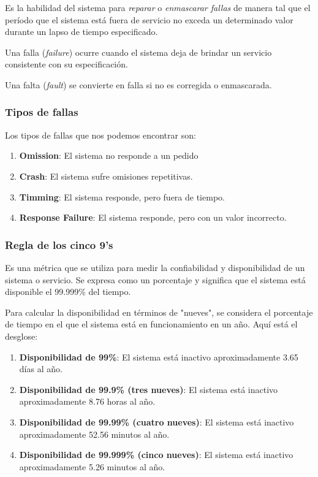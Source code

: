 \documentclass{article}
\begin{document}
			Es la habilidad del sistema para \textit{reparar} o \textit{enmascarar fallas} de manera tal que el período que el sistema está fuera de servicio no exceda un determinado valor durante un lapso de tiempo especificado.
			
			Una falla (\textit{failure}) ocurre cuando el sistema deja de brindar un servicio consistente con su especificación. 
			
			Una falta (\textit{fault}) se convierte en falla si no es corregida o enmascarada.
			
		\subsubsection{Tipos de fallas}
		
			Los tipos de fallas que nos podemos encontrar son: 
		
			\begin{enumerate}
				\item \textbf{Omission}: El sistema no responde a un pedido
				
				\item \textbf{Crash}: El sistema sufre omisiones repetitivas.
				
				\item \textbf{Timming}: El sistema responde, pero fuera de tiempo.
				
				\item  \textbf{Response Failure}: El sistema responde, pero con un valor incorrecto.
				
			\end{enumerate}
			
		\subsubsection{Regla de los cinco 9's}
		Es una métrica que se utiliza para medir la confiabilidad y disponibilidad de un sistema o servicio. Se expresa como un porcentaje y significa que el sistema está disponible el 99.999\% del tiempo.
		
		Para calcular la disponibilidad en términos de "nueves", se considera el porcentaje de tiempo en el que el sistema está en funcionamiento en un año. Aquí está el desglose:
		\begin{enumerate}
			\item \textbf{Disponibilidad de 99\%}: El sistema está inactivo aproximadamente 3.65 días al año.
			
			\item \textbf{Disponibilidad de 99.9\% (tres nueves)}: El sistema está inactivo aproximadamente 8.76 horas al año.
			
			\item \textbf{Disponibilidad de 99.99\% (cuatro nueves)}:  El sistema está inactivo aproximadamente 52.56 minutos al año.
			
			\item  \textbf{Disponibilidad de 99.999\% (cinco nueves)}: El sistema está inactivo aproximadamente 5.26 minutos al año.
			
		\end{enumerate}
		
\end{document}
